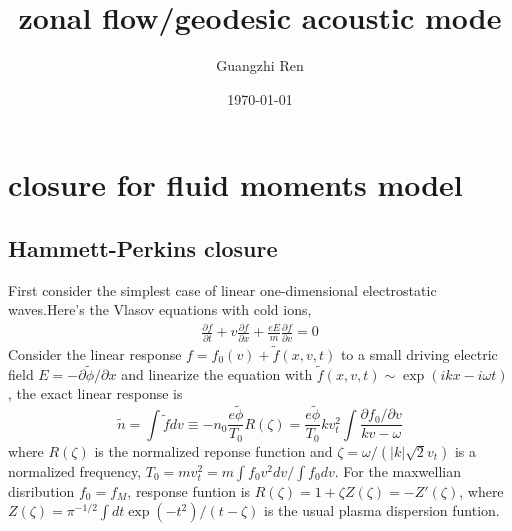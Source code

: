 \documentclass[11pt,a4paper]{article}
\title{zonal flow/geodesic acoustic mode}
\author{Guangzhi Ren}
\date{\today}
\begin{document}
	
	\maketitle


\section{closure for fluid moments model}
\subsection{Hammett-Perkins closure}
First consider the simplest case of linear one-dimensional electrostatic waves.Here's the Vlasov equations with cold ions,
	\begin{equation}
	\begin{aligned}
		\frac{\partial{f}}{\partial{t}}
		+v\frac{\partial{f}}{\partial{x}}
		+\frac{eE}{m}\frac{\partial{f}}{\partial{v}}=0
	\end{aligned}
	\end{equation}	
Consider the linear response $f=f_0(v)+\tilde{f}(x,v,t)$ to a small driving electric field $E=-\partial\tilde{\phi}/\partial{x}$ and linearize the equation with $\tilde{f}(x,v,t)\sim\exp(ikx-i\omega{t})$, the exact linear response is
	\begin{equation}
		\tilde{n}=\int\tilde{f}dv \equiv -n_0\frac{e\tilde{\phi}}{T_0}R(\zeta)
		=\frac{e\tilde{\phi}}{T_0}kv_t^2\int\frac{\partial{f_0}/\partial{v}}{kv-\omega}
	\end{equation}	
where $R(\zeta)$ is the normalized reponse function and $\zeta=\omega/(|k|\sqrt{2}v_t)$	is a normalized frequency, $T_0=mv_t^2=m\int{f_0}v^2dv/\int{f_0}dv$. For the maxwellian disribution $f_0=f_M$, response funtion is $R(\zeta)=1+\zeta{Z(\zeta)}=-Z'(\zeta)$, where $Z(\zeta)=\pi^{-1/2}\int{dt}\exp(-t^2)/(t-\zeta)$ is the usual plasma dispersion funtion.
\end{document}
